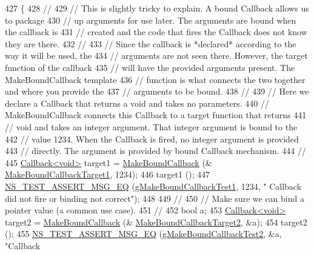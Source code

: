 \begin{DoxyCode}
427 \{
428   \textcolor{comment}{//}
429   \textcolor{comment}{// This is slightly tricky to explain.  A bound Callback allows us to package}
430   \textcolor{comment}{// up arguments for use later.  The arguments are bound when the callback is}
431   \textcolor{comment}{// created and the code that fires the Callback does not know they are there.}
432   \textcolor{comment}{// }
433   \textcolor{comment}{// Since the callback is *declared* according to the way it will be used, the}
434   \textcolor{comment}{// arguments are not seen there.  However, the target function of the callback}
435   \textcolor{comment}{// will have the provided arguments present.  The MakeBoundCallback template}
436   \textcolor{comment}{// function is what connects the two together and where you provide the }
437   \textcolor{comment}{// arguments to be bound.}
438   \textcolor{comment}{//}
439   \textcolor{comment}{// Here we declare a Callback that returns a void and takes no parameters.}
440   \textcolor{comment}{// MakeBoundCallback connects this Callback to a target function that returns}
441   \textcolor{comment}{// void and takes an integer argument.  That integer argument is bound to the }
442   \textcolor{comment}{// value 1234.  When the Callback is fired, no integer argument is provided}
443   \textcolor{comment}{// directly.  The argument is provided by bound Callback mechanism. }
444   \textcolor{comment}{//}
445   \hyperlink{classns3_1_1Callback}{Callback<void>} target1 = \hyperlink{group__makeboundcallback_ga1725d6362e6065faa0709f7c93f8d770}{MakeBoundCallback} (&
      \hyperlink{callback-test-suite_8cc_af2a65c75c04ccf8189d0b888395a6f32}{MakeBoundCallbackTarget1}, 1234);
446   target1 ();
447   \hyperlink{group__testing_ga2a9d78cffb3db8e867c35fff0b698cf5}{NS\_TEST\_ASSERT\_MSG\_EQ} (\hyperlink{callback-test-suite_8cc_a3d1ab60494f3dec0f04a96e1a159929e}{gMakeBoundCallbackTest1}, 1234, \textcolor{stringliteral}{"
      Callback did not fire or binding not correct"});
448 
449   \textcolor{comment}{//}
450   \textcolor{comment}{// Make sure we can bind a pointer value (a common use case).}
451   \textcolor{comment}{//}
452   \textcolor{keywordtype}{bool} a;
453   \hyperlink{classns3_1_1Callback}{Callback<void>} target2 = \hyperlink{group__makeboundcallback_ga1725d6362e6065faa0709f7c93f8d770}{MakeBoundCallback} (&
      \hyperlink{callback-test-suite_8cc_a5b37e6377261ecf9c70641469e538700}{MakeBoundCallbackTarget2}, &a);
454   target2 ();
455   \hyperlink{group__testing_ga2a9d78cffb3db8e867c35fff0b698cf5}{NS\_TEST\_ASSERT\_MSG\_EQ} (\hyperlink{callback-test-suite_8cc_a1caffc0c35f737606a8f10bd508dd0b9}{gMakeBoundCallbackTest2}, &a, \textcolor{stringliteral}{"Callback
}
\end{DoxyCode}
